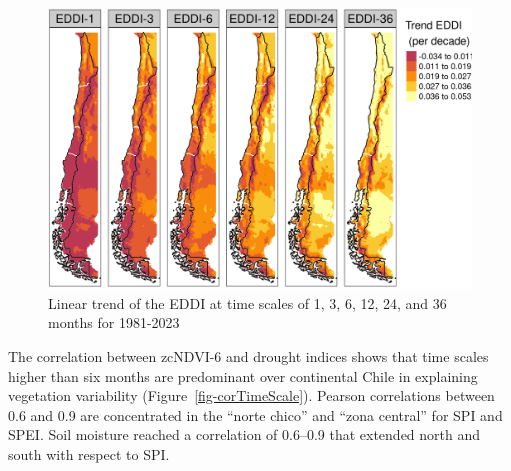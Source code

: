 \documentclass[
  number,
  preprint,
  3p]{elsarticle}
\begin{document}
\begin{figure}[!ht]

{\centering \includegraphics{../output/figs/trend_raster_EDDI_1981-2023.png}

}

\caption{\label{fig-trendEDDI}Linear trend of the EDDI at time scales of
1, 3, 6, 12, 24, and 36 months for 1981-2023}

\end{figure}

The correlation between zcNDVI-6 and drought indices shows that time
scales higher than six months are predominant over continental Chile in
explaining vegetation variability (Figure~\ref{fig-corTimeScale}).
Pearson correlations between 0.6 and 0.9 are concentrated in the ``norte
chico'' and ``zona central'' for SPI and SPEI. Soil moisture reached a
correlation of 0.6--0.9 that extended north and south with respect to
SPI.
\end{document}
